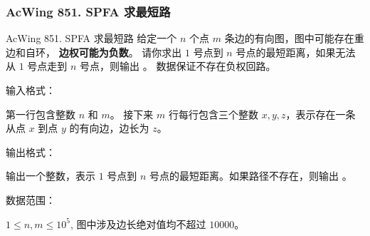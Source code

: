 \subsubsection{AcWing 851. SPFA 求最短路}

\begin{titledbox}{AcWing 851. SPFA 求最短路}
    给定一个 $n$ 个点 $m$ 条边的有向图，图中可能存在重边和自环， \textbf{边权可能为负数}。 请你求出 $1$ 号点到 $n$ 号点的最短距离，如果无法从 $1$ 号点走到 $n$ 号点，则输出 。
    数据保证不存在负权回路。

    输入格式：

    第一行包含整数 $n$ 和 $m$。 接下来 $m$ 行每行包含三个整数 $x,y,z$，表示存在一条从点 $x$ 到点 $y$ 的有向边，边长为 $z$。

    输出格式：

    输出一个整数，表示 $1$ 号点到 $n$ 号点的最短距离。如果路径不存在，则输出 。

    数据范围：

    $1 \le n,m \le 10^5$, 图中涉及边长绝对值均不超过 $10000$。

    \begin{inputblock}
         \\
         \\
         \\
    \end{inputblock}
    \begin{outputblock}
    \end{outputblock}
\end{titledbox}

